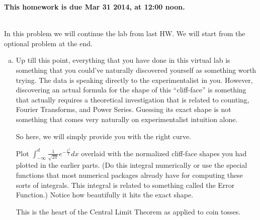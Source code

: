 \documentclass[]{article}
\newif\ifsolutions
\renewcommand{\answer}[1]{{\color{mydarkblue}\textbf{Solution:}#1}}
\begin{document}
\maketitle
{}
\vspace{0.5em}
{\Large{\textbf{This homework is due Mar 31 2014, at 12:00 noon.}}}

\begin{qunlist}
  
\\    
In this problem we will continue the lab from last HW. We will start from the optional problem at the end.
\begin{enumerate}[a)]

\qpart 
\item  Up till this point, everything that
  you have done in this virtual lab is something that you could've
  naturally discovered yourself as something worth trying. The data is
  speaking directly to the experimentalist in you. However,
  discovering an actual formula for the shape of this ``cliff-face'' is
  something that actually requires a theoretical investigation that is
  related to counting, Fourier Transforms, and Power Series. Guessing
  its exact shape is not something that comes very naturally on
  experimentalist intuition alone.

  So here, we will simply provide you with the right curve.

  Plot $\int_{-\infty}^d\frac{1}{\sqrt{2\pi}} e^{-\frac{x^2}{2}}dx$
  overlaid with the normalized cliff-face shapes you had plotted in
  the earlier parts. (Do this integral numerically or use the special
  functions that most numerical packages already have for computing
  these sorts of integrals. This integral is related to something
  called the Error Function.) Notice how beautifully it hits the exact
  shape. 

  This is the heart of the Central Limit Theorem as applied to coin
  tosses.

\ifsolutions{ \answer {
We can see that the theoretical curve fits the shape perfectly.
And the zigzags smooth out as $k$ increases.
\begin{figure}[h!]
\center
\texttt{[image: figs/part\_a.png]}
\end{figure}
}}\fi


\end{enumerate}
\end{qunlist}
\end{document}
